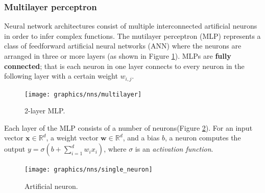  	\subsubsection{Multilayer perceptron}  \label{Section 2.2.2.2}
	Neural network architectures consist of multiple interconnected artificial neurons in order to infer complex functions. The mutilayer perceptron (MLP) represents a class of feedforward artificial neural networks (ANN) where the neurons are arranged in three or more layers (as shown in Figure \ref{Fig: prep/ml/mlp/mlp}). MLPs are \textbf{fully connected}; that is each neuron in one layer connects to every neuron in the following layer with a certain weight $w_{i, j}$.

	\begin{figure}[H]
		\centering
		\texttt{[image: graphics/nns/multilayer]}
		\caption[Multilayer perceptron]{
			2-layer MLP.
		}
		\label{Fig: prep/ml/mlp/mlp}	
	\end{figure}	

	 Each layer of the MLP consists of a number of neurons(Figure \ref{Fig: prep/ml/mlp/neuron}). For an input vector $\mathbf{x}\in\mathbb{R}^d$, a weight vector $\mathbf{w}\in\mathbb{R}^d$, and a bias $b$, a neuron computes the output $y = \sigma(b + \sum_{i=1}^{d} w_i x_i)$, where $\sigma$ is an \textit{activation function}.
	
	\begin{figure}[H]
		\centering
		
		\texttt{[image: graphics/nns/single\_neuron]}
		\caption[\textbf{Artificial neuron}]{
			Artificial neuron. 
		}
		\label{Fig: prep/ml/mlp/neuron}
	\end{figure}
